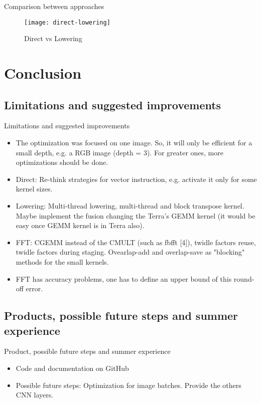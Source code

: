 \begin{frame}{Comparison between approaches}
\begin{figure}[ht] \label{fig1} 
\texttt{[image: direct-lowering]}
 \caption{Direct vs Lowering} 
\end{figure}
\end{frame}

\section{Conclusion}
\subsection{Limitations and suggested improvements}
\begin{frame}{Limitations and suggested improvements}
  \begin{itemize}
  \item {
   The optimization was focused on one image. So, it will only be efficient for a small depth, e.g. a RGB image (depth = 3). For greater ones, more optimizations should be done.
  }
  \item {
   Direct: Re-think strategies for vector instruction, e.g. activate it only for some kernel sizes. 
  }
  \item {
   Lowering: Multi-thread lowering, multi-thread and block transpose kernel. Maybe implement the fusion changing the Terra's GEMM kernel (it would be easy once GEMM kernel is in Terra also).
  }
  \item {
   FFT: CGEMM instead of the CMULT (such as fbfft [4]), twidle factors reuse, twidle factors during staging. Ovearlap-add and overlap-save as "blocking" methods for the small kernels. 
  }
  \item {
  FFT has accuracy problems, one has to define an upper bound of this round-off error.
  }
  \end{itemize}
\end{frame}
\subsection{Products, possible future steps and summer experience}
\begin{frame}{Product, possible future steps and summer experience}
  \begin{itemize}
  \item {
   Code and documentation on GitHub
  }
  \item {
   Possible future steps: Optimization for image batches.    Provide the others CNN layers.
  }
  \end{itemize}
\end{frame}

